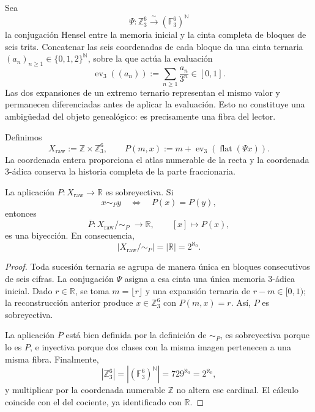 Sea
\[
 \Psi:\mathbb Z_3^6\xrightarrow{\ \sim\ }
       (\mathbb F_3^6)^{\mathbb N}
\]
la conjugación Hensel entre la memoria inicial y la cinta completa de
bloques de seis trits. Concatenar las seis coordenadas de cada bloque da
una cinta ternaria
\(
 (a_n)_{n\geq 1}\in\{0,1,2\}^{\mathbb N}
\), sobre la que actúa la evaluación
\[
 \operatorname{ev}_3((a_n))
 :=\sum_{n\geq1}\frac{a_n}{3^n}\in[0,1].
\]
Las dos expansiones de un extremo ternario representan el mismo valor y
permanecen diferenciadas antes de aplicar la evaluación. Esto no constituye
una ambigüedad del objeto genealógico: es precisamente una fibra del lector.

Definimos
\[
 X_{\mathrm{raw}}:=\mathbb Z\times\mathbb Z_3^6,
 \qquad
 P(m,x):=m+\operatorname{ev}_3(\operatorname{flat}(\Psi x)).
\]
La coordenada entera proporciona el atlas numerable de la recta y la
coordenada 3-ádica conserva la historia completa de la parte fraccionaria.

\begin{theorem}
\label{p12-83-c18-s2:hmtch:thm-cociente-real}
La aplicación \(P:X_{\mathrm{raw}}\to\mathbb R\) es sobreyectiva. Si
\[
 x\sim_P y
 \quad\Longleftrightarrow\quad
 P(x)=P(y),
\]
entonces
\[
 \overline P:X_{\mathrm{raw}}/\!\sim_P\;\longrightarrow\mathbb R,
 \qquad [x]\longmapsto P(x),
\]
es una biyección. En consecuencia,
\[
 \left|X_{\mathrm{raw}}/\!\sim_P\right|
 =|\mathbb R|
 =2^{\aleph_0}.
\]
\end{theorem}

\begin{proof}
Toda sucesión ternaria se agrupa de manera única en bloques consecutivos de
seis cifras. La conjugación \(\Psi\) asigna a esa cinta una única memoria
3-ádica inicial. Dado \(r\in\mathbb R\), se toma
\(m=\lfloor r\rfloor\) y una expansión ternaria de
\(r-m\in[0,1)\); la reconstrucción anterior produce
\(x\in\mathbb Z_3^6\) con \(P(m,x)=r\). Así, \(P\) es sobreyectiva.

La aplicación \(\overline P\) está bien definida por la definición de
\(\sim_P\), es sobreyectiva porque lo es \(P\), e inyectiva porque dos
clases con la misma imagen pertenecen a una misma fibra. Finalmente,
\[
 |\mathbb Z_3^6|
 =\left|(\mathbb F_3^6)^{\mathbb N}\right|
 =729^{\aleph_0}
 =2^{\aleph_0},
\]
y multiplicar por la coordenada numerable \(\mathbb Z\) no altera ese
cardinal. El cálculo coincide con el del cociente, ya identificado con
\(\mathbb R\).
\end{proof}

